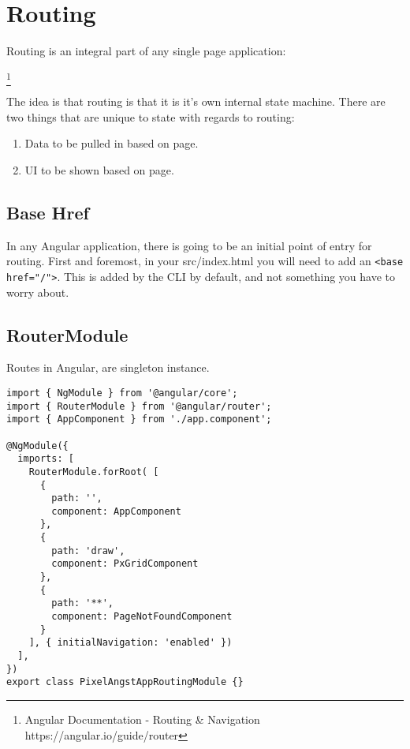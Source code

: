 \section{ Routing }
\maketitle{}

Routing is an integral part of any single page application:
\begin{displayquote}
 \footnote{Angular Documentation - Routing \& Navigation https://angular.io/guide/router}
\end{displayquote}
The idea is that routing is that it is it's own internal state machine. There
are two things that are unique to state with regards to routing:
\begin{enumerate}
  \item Data to be pulled in based on page.
  \item UI to be shown based on page.
\end{enumerate}

\subsection{Base Href}
In any Angular application, there is going to be an initial point of entry for
routing. First and foremost, in your src/index.html you will need to add an
\lstinline{<base href="/">}. This is added by the CLI by default, and not
something you have to worry about.

\subsection{ RouterModule }
Routes in Angular, are singleton instance.

\begin{lstlisting}[caption=app.module.ts file]
import { NgModule } from '@angular/core';
import { RouterModule } from '@angular/router';
import { AppComponent } from './app.component';

@NgModule({
  imports: [
    RouterModule.forRoot( [
      {
        path: '',
        component: AppComponent
      },
      {
        path: 'draw',
        component: PxGridComponent
      },
      {
        path: '**',
        component: PageNotFoundComponent
      }
    ], { initialNavigation: 'enabled' })
  ],
})
export class PixelAngstAppRoutingModule {}
\end{lstlisting}

